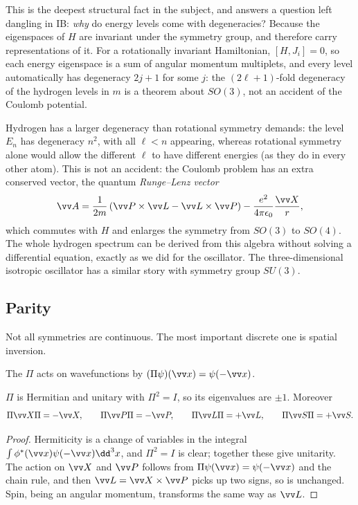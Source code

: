 This is the deepest structural fact in the subject, and answers a question left dangling in IB: \emph{why} do energy levels come with degeneracies? Because the eigenspaces of $H$ are invariant under the symmetry group, and therefore carry representations of it. For a rotationally invariant Hamiltonian, $[H, J_i] = 0$, so each energy eigenspace is a sum of angular momentum multiplets, and every level automatically has degeneracy $2j+1$ for some $j$: the $(2\ell+1)$-fold degeneracy of the hydrogen levels in $m$ is a theorem about $SO(3)$, not an accident of the Coulomb potential.

\begin{example}
    Hydrogen has a larger degeneracy than rotational symmetry demands: the level $E_n$ has degeneracy $n^2$, with all $\ell < n$ appearing, whereas rotational symmetry alone would allow the different $\ell$ to have different energies (as they do in every other atom). This is not an accident: the Coulomb problem has an extra conserved vector, the quantum \emph{Runge--Lenz vector}
    $$
    \vv A = \frac{1}{2m}\left( \vv P \times \vv L - \vv L \times \vv P \right) - \frac{e^2}{4\pi\epsilon_0}\frac{\vv X}{r},
    $$
    which commutes with $H$ and enlarges the symmetry from $SO(3)$ to $SO(4)$. The whole hydrogen spectrum can be derived from this algebra without solving a differential equation, exactly as we did for the oscillator. The three-dimensional isotropic oscillator has a similar story with symmetry group $SU(3)$.
\end{example}

\subsection{Parity}

Not all symmetries are continuous. The most important discrete one is spatial inversion.

\begin{definition}[Parity]
    The  $\Pi$ acts on wavefunctions by $(\Pi\psi)(\vv x) = \psi(-\vv x)$.
\end{definition}

\begin{proposition}
    $\Pi$ is Hermitian and unitary with $\Pi^2 = I$, so its eigenvalues are $\pm1$. Moreover
    $$
    \Pi \vv X \Pi = -\vv X, \qquad \Pi \vv P \Pi = -\vv P, \qquad \Pi \vv L \Pi = +\vv L, \qquad \Pi\vv S\Pi = +\vv S.
    $$
\end{proposition}
\begin{proof}
    Hermiticity is a change of variables in the integral $\int \phi^*(\vv x)\psi(-\vv x)\dd^3x$, and $\Pi^2 = I$ is clear; together these give unitarity. The action on $\vv X$ and $\vv P$ follows from $\Pi\psi(\vv x) = \psi(-\vv x)$ and the chain rule, and then $\vv L = \vv X \times \vv P$ picks up two signs, so is unchanged. Spin, being an angular momentum, transforms the same way as $\vv L$.
\end{proof}

